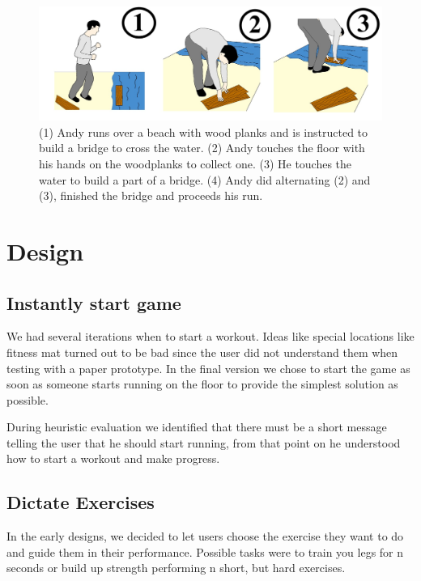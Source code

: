 \documentclass{sigchi}
\begin{document}
  \begin{figure}[!htb]
    \includegraphics[width=\linewidth]{Image_14.jpg}
  \endminipage\hfill
    \caption{(1) Andy runs over a beach with wood planks and is instructed to build a bridge to cross the water. (2) Andy touches the floor with his hands on the woodplanks to collect one. (3) He touches the water to build a part of a bridge. (4) Andy did alternating (2) and (3), finished the bridge and proceeds his run.}\label{fig:awesome_image3}
  \end{figure}

\section{Design}

  \subsection{Instantly start game}

    We had several iterations when to start a workout. Ideas like special locations like fitness mat turned out to be bad since the user did not understand them  when testing with a paper prototype. In the final version we chose to start the game as soon as someone starts running on the floor to provide the simplest   solution as possible.

    During heuristic evaluation we identified that there must be a short message telling the user that he should start running, from that point on he understood  how to start a workout and make progress.

  \subsection{Dictate Exercises}

    In the early designs, we decided to let users choose the exercise they want to do and guide them in their performance. Possible tasks were to train you legs  for n seconds or build up strength performing n short, but hard exercises.
\end{document}
